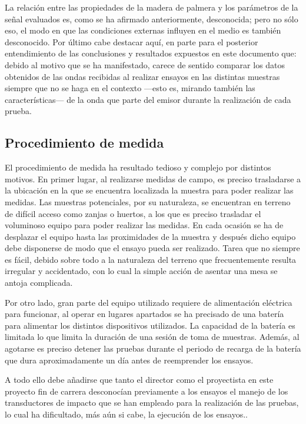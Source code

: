 La relación entre las propiedades de la madera de palmera y los parámetros
de la señal evaluados es, como se ha afirmado anteriormente, desconocida;
pero no sólo eso, el modo en que las condiciones externas influyen en el
medio es también desconocido. Por último cabe destacar aquí, en parte para
el posterior entendimiento de las conclusiones y resultados expuestos en
este documento que: debido al motivo que se ha manifestado, carece de
sentido comparar los datos obtenidos de las ondas recibidas al realizar
ensayos en las distintas muestras siempre que no se haga en el contexto
---esto es, mirando también las características--- de la onda que parte del
emisor durante la realización de cada prueba.


\subsection{Procedimiento de medida}

El procedimiento de medida ha resultado tedioso y complejo por distintos
motivos. En primer lugar, al realizarse medidas de campo, es preciso
trasladarse a la ubicación en la que se encuentra localizada la muestra
para poder realizar las medidas. Las muestras potenciales, por su
naturaleza, se encuentran en terreno de difícil acceso como zanjas o
huertos, a los que es preciso trasladar el voluminoso equipo para poder
realizar las medidas. En cada ocasión se ha de desplazar el equipo hasta
las proximidades de la muestra y después dicho equipo debe disponerse de
modo que el ensayo pueda ser realizado. Tarea que no siempre es fácil,
debido sobre todo a la naturaleza del terreno que frecuentemente resulta
irregular y accidentado, con lo cual la simple acción de asentar una mesa
se antoja complicada.

Por otro lado, gran parte del equipo utilizado requiere de alimentación
eléctrica para funcionar, al operar en lugares apartados se ha precisado de
una batería para alimentar los distintos dispositivos utilizados. La
capacidad de la batería es limitada lo que limita la duración de una sesión
de toma de muestras. Además, al agotarse es preciso detener las pruebas
durante el periodo de recarga de la batería que dura aproximadamente un día
antes de reemprender los ensayos.

A todo ello debe añadirse que tanto el director como el proyectista en este
proyecto fin de carrera desconocían previamente a los ensayos el manejo de
los transductores de impacto que se han empleado para la realización de las
pruebas, lo cual ha dificultado, más aún si cabe, la ejecución de los
ensayos..
